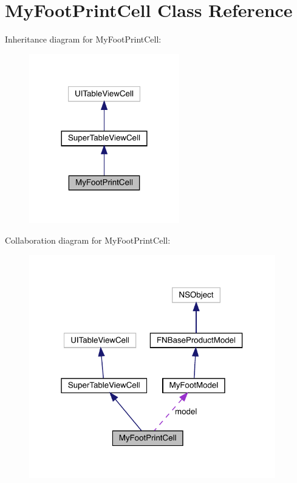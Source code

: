 \hypertarget{interface_my_foot_print_cell}{}\section{My\+Foot\+Print\+Cell Class Reference}
\label{interface_my_foot_print_cell}


Inheritance diagram for My\+Foot\+Print\+Cell\+:\nopagebreak
\begin{figure}[H]
\begin{center}
\leavevmode
\includegraphics[width=185pt]{interface_my_foot_print_cell__inherit__graph}
\end{center}
\end{figure}


Collaboration diagram for My\+Foot\+Print\+Cell\+:\nopagebreak
\begin{figure}[H]
\begin{center}
\leavevmode
\includegraphics[width=304pt]{interface_my_foot_print_cell__coll__graph}
\end{center}
\end{figure}
